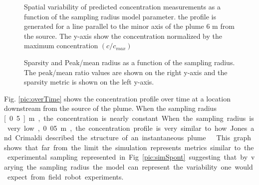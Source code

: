 \documentclass[ letterpaper, 10 pt, conference]{ieeeconf}  %
\begin{document}
\begin{figure}[thpb]
      \centering
      \caption{Spatial variability of predicted concentration measurements as a function of the sampling radius model parameter.  the profile is generated for a line parallel to the minor axis of the plume 6 m from the source.  The y-axis show the concentration normalized by the maximum concentration $(c/c_{max})$}
   \label{pic:overSpace}
 \end{figure}

\begin{figure}[thpb]
      \centering
      \caption{Sparsity and Peak/mean radius as a function of the sampling radius.   The peak/mean ratio values are shown on the right y-axis and the sparsity metric is shown on the left y-axis.}
   \label{pic:SandP2MoverRad}
 \end{figure}

Fig. \ref{pic:overTime} shows the concentration profile over time at a location downstream from the source of the plume.  When the sampling radius \unit[0.5]{m}, the concentration is nearly constant.  When the sampling radius is very low, 0.05 m, the concentration profile is very similar to how Jones and Crimaldi described the structure of an instantaneous plume \cite{Crimaldi2002}\cite{Jones1983}.  This graph shows that far from the limit the simulation represents metrics similar  to the  experimental sampling represented in Fig. \ref{pic:simSpont} suggesting that by varying the sampling radius the model can represent the variability one would expect from field robot experiments.
\end{document}
